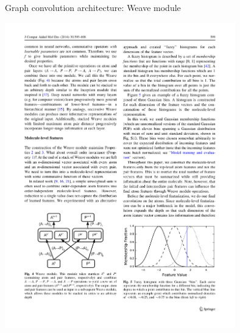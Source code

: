 \documentclass[xetex,compress]{beamer}
\begin{document}
\begin{frame}{Graph convolution architecture: Weave module}
  \begin{center}
    \includegraphics[width=0.75\textwidth]{./figures/gc_fig4.pdf}
  \end{center}
\end{frame}
\end{document}
